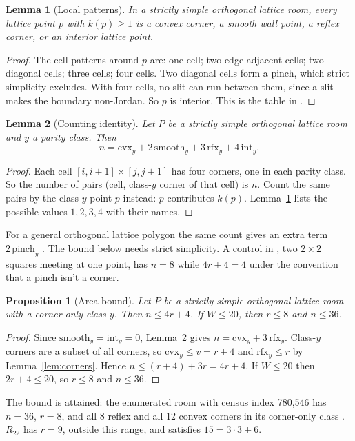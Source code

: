 \documentclass[11pt]{article}
\newtheorem{lemma}{Lemma}
\newtheorem{proposition}{Proposition}
\theoremstyle{definition}
\theoremstyle{remark}
\newcommand{\cvx}{\mathrm{cvx}}
\newcommand{\rfx}{\mathrm{rfx}}
\newcommand{\smooth}{\mathrm{smooth}}
\newcommand{\intr}{\mathrm{int}}
\newcommand{\pinch}{\mathrm{pinch}}
\begin{document}
\begin{lemma}[Local patterns]\label{lem:patterns}
In a strictly simple orthogonal lattice room, every lattice point $p$ with
$k(p)\ge1$ is a convex corner, a smooth wall point, a reflex corner, or an
interior lattice point.
\end{lemma}
\begin{proof}
The cell patterns around $p$ are: one cell; two edge-adjacent cells; two
diagonal cells; three cells; four cells. Two diagonal cells form a pinch,
which strict simplicity excludes. With four cells, no slit can run between
them, since a slit makes the boundary non-Jordan. So $p$ is interior.
This is the table in \cite[\S1]{d97}.
\end{proof}

\begin{lemma}[Counting identity]\label{lem:count}
Let $P$ be a strictly simple orthogonal lattice room and $y$ a parity class.
Then
\[
n=\cvx_y+2\,\smooth_y+3\,\rfx_y+4\,\intr_y.
\]
\end{lemma}
\begin{proof}
Each cell $[i,i+1]\times[j,j+1]$ has four corners, one in each parity
class. So the number of pairs (cell, class-$y$ corner of that cell) is $n$.
Count the same pairs by the class-$y$ point $p$ instead: $p$ contributes
$k(p)$. Lemma~\ref{lem:patterns} lists the possible values $1,2,3,4$ with
their names.
\end{proof}

For a general orthogonal lattice polygon the same count gives an extra term
$2\,\pinch_y$ \cite[\S1]{d97}. The bound below needs strict simplicity.
A control in \cite[\S2]{d97}, two $2\times2$ squares meeting at one point,
has $n=8$ while $4r+4=4$ under the convention that a pinch isn't a corner.

\begin{proposition}[Area bound]\label{prop:area}
Let $P$ be a strictly simple orthogonal lattice room with a corner-only
class $y$. Then $n\le 4r+4$. If $W\le 20$, then $r\le8$ and $n\le36$.
\end{proposition}
\begin{proof}
Since $\smooth_y=\intr_y=0$, Lemma~\ref{lem:count} gives
$n=\cvx_y+3\,\rfx_y$. Class-$y$ corners are a subset of all corners, so
$\cvx_y\le v=r+4$ and $\rfx_y\le r$ by Lemma~\ref{lem:corners}. Hence
$n\le (r+4)+3r=4r+4$. If $W\le20$ then $2r+4\le20$, so $r\le8$ and
$n\le36$.
\end{proof}

The bound is attained: the enumerated room with census index 780{,}546 has
$n=36$, $r=8$, and all 8 reflex and all 12 convex corners in its
corner-only class \cite[\S2--3]{d97}. $R_{22}$ has $r=9$, outside this
range, and satisfies $15=3\cdot3+6$.
\end{document}
